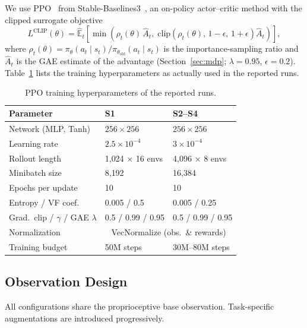 \documentclass[conference,a4paper]{IEEEtran}
\begin{document}
We use PPO~\cite{schulman2017ppo} from Stable-Baselines3~\cite{raffin2021sb3}, an on-policy actor--critic method with the clipped surrogate objective
\begin{equation}
\label{eq:ppo}
L^{\mathrm{CLIP}}(\theta) = \hat{\mathbb{E}}_t \!\left[ \min\!\left( \rho_t(\theta)\,\hat{A}_t,\; \mathrm{clip}\!\left(\rho_t(\theta),\, 1{-}\epsilon,\, 1{+}\epsilon\right)\hat{A}_t \right) \right],
\end{equation}
where $\rho_t(\theta) = \pi_\theta(a_t \mid s_t)/\pi_{\theta_{\mathrm{old}}}(a_t \mid s_t)$ is the importance-sampling ratio and $\hat{A}_t$ is the GAE estimate of the advantage (Section~\ref{sec:mdp}; $\lambda = 0.95$, $\epsilon = 0.2$). Table~\ref{tab:hyperparams} lists the training hyperparameters as actually used in the reported runs.

\begin{table}[t]
\caption{PPO training hyperparameters of the reported runs.}
\label{tab:hyperparams}
\centering
\footnotesize
\begin{tabular}{@{}lll@{}}
\toprule
\textbf{Parameter} & \textbf{S1} & \textbf{S2--S4} \\
\midrule
Network (MLP, Tanh) & $256 \times 256$ & $256 \times 256$ \\
Learning rate & $2.5 \times 10^{-4}$ & $3 \times 10^{-4}$ \\
Rollout length & 1{,}024 $\times$ 16 envs & 4{,}096 $\times$ 8 envs \\
Minibatch size & 8{,}192 & 16{,}384 \\
Epochs per update & 10 & 10 \\
Entropy / VF coef. & 0.005 / 0.5 & 0.005 / 0.25 \\
Grad.\ clip / $\gamma$ / GAE $\lambda$ & 0.5 / 0.99 / 0.95 & 0.5 / 0.99 / 0.95 \\
Normalization & \multicolumn{2}{c}{VecNormalize (obs.\ \& rewards)} \\
Training budget & 50M steps & 30M--80M steps \\
\bottomrule
\end{tabular}
\end{table}

\subsection{Observation Design}
\label{sec:obs_design}

All configurations share the proprioceptive base observation. Task-specific augmentations are introduced progressively.
\end{document}
